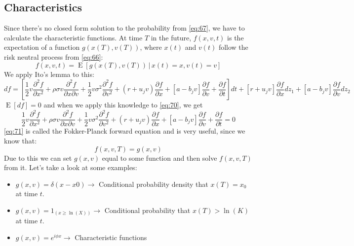\documentclass{article}
\DeclareMathOperator{\E}{E}
\begin{document}
\subsection{Characteristics}
Since there’s no closed form solution to the probability from \ref{eq:67}, we have to calculate the characteristic functions. At time $T$ in the future, $f(x, v, t)$ is the expectation of a function $g(x(T), v(T))$, where $x(t)$ and $v(t)$ follow the risk neutral process from \ref{eq:66}:
\begin{equation}
    f(x, v, t) = \E[g(x(T), v(T)) \,|\, x(t) = x, v(t) = v]
\end{equation}
We apply Ito's lemma to this:
\begin{equation} \label{eq:70}
    df = \left[\frac{1}{2}v\frac{\partial^{2} f}{\partial x^{2}} + \rho \sigma v \frac{\partial^{2} f}{\partial x \partial v} + \frac{1}{2}v\sigma^{2}\frac{\partial^{2} f}{\partial v^{2}} + (r + u_{j} v) \frac{\partial f}{\partial x} + [a-b_{j}v] \frac{\partial f}{\partial v} + \frac{\partial f}{\partial t}\right] dt + [r + u_{j} v] \frac{\partial f}{\partial x}dz_{1} + [a-b_{j}v] \frac{\partial f}{\partial v} dz_{2}
\end{equation}
$\E[df]=0$ and when we apply this knowledge to \ref{eq:70}, we get 
\begin{equation}\label{eq:71}
    \frac{1}{2}v\frac{\partial^{2} f}{\partial x^{2}} + \rho \sigma v \frac{\partial^{2} f}{\partial x \partial v} + \frac{1}{2}v\sigma^{2}\frac{\partial^{2} f}{\partial v^{2}} + (r + u_{j} v) \frac{\partial f}{\partial x} + [a-b_{j}v] \frac{\partial f}{\partial v} + \frac{\partial f}{\partial t} = 0
\end{equation}
\ref{eq:71} is called the Fokker-Planck forward equation and is very useful, since we know that:
\begin{equation}
    f(x, v, T) = g(x, v)
\end{equation}
Due to this we can set $g(x, v)$ equal to some function and then solve $f(x, v, T)$ from it. Let’s take a look at some examples:
\begin{itemize}
    \item $g(x, v) = \delta(x - x0) \rightarrow$  Conditional probability density that $x(T) = x_{0}$ at time $t$.
    \item $g(x,v) = 1_{(x \geq \ln(X))} \rightarrow$ Conditional probability that $x(T) > \ln(K)$ at time $t$.
    \item $g(x,v) = e^{i\phi x} \rightarrow$ Characteristic functions
\end{itemize}
\end{document}
